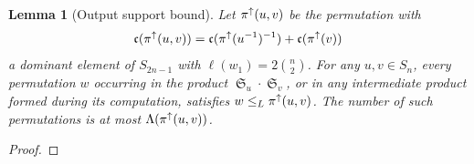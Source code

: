 \documentclass{amsart}
\newtheorem{lemma}{Lemma}[section]
\theoremstyle{definition}
\theoremstyle{remark}
\numberwithin{equation}{section}
\DeclareMathOperator{\sch}{\mathfrak{S}}
\newcommand{\code}{\mathfrak{c}}
\begin{document}
\begin{lemma}[Output support bound] \label{lemma:outputsupport}
Let $\pi^\uparrow(u,v)$ be the permutation with
$$\code(\dom(u,v))=\code(\dom(u^{-1})^{-1})+\code(\mdom{v})$$
a dominant element of $S_{2n-1}$ with $\ell(w_1)=2\binom{n}{2}$. For any $u,v\in S_n$, every permutation $w$ occurring in the product $\sch_u\cdot\sch_v$, or in any intermediate product formed during its computation, satisfies $w\leq_L \pi^\uparrow(u,v)$. The number of such permutations is at most $\Lambda(\pi^\uparrow(u,v))$.
\end{lemma}
\begin{proof}

\end{proof}

\end{document}
